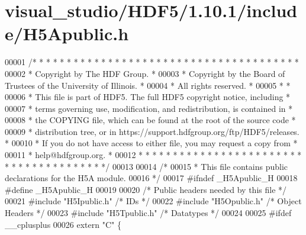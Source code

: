 \hypertarget{visual__studio_2_h_d_f5_21_810_81_2include_2_h5_apublic_8h_source}{}\section{visual\+\_\+studio/\+H\+D\+F5/1.10.1/include/\+H5\+Apublic.h}
\label{visual__studio_2_h_d_f5_21_810_81_2include_2_h5_apublic_8h_source}

\begin{DoxyCode}
00001 \textcolor{comment}{/* * * * * * * * * * * * * * * * * * * * * * * * * * * * * * * * * * * * * * *}
00002 \textcolor{comment}{ * Copyright by The HDF Group.                                               *}
00003 \textcolor{comment}{ * Copyright by the Board of Trustees of the University of Illinois.         *}
00004 \textcolor{comment}{ * All rights reserved.                                                      *}
00005 \textcolor{comment}{ *                                                                           *}
00006 \textcolor{comment}{ * This file is part of HDF5.  The full HDF5 copyright notice, including     *}
00007 \textcolor{comment}{ * terms governing use, modification, and redistribution, is contained in    *}
00008 \textcolor{comment}{ * the COPYING file, which can be found at the root of the source code       *}
00009 \textcolor{comment}{ * distribution tree, or in https://support.hdfgroup.org/ftp/HDF5/releases.  *}
00010 \textcolor{comment}{ * If you do not have access to either file, you may request a copy from     *}
00011 \textcolor{comment}{ * help@hdfgroup.org.                                                        *}
00012 \textcolor{comment}{ * * * * * * * * * * * * * * * * * * * * * * * * * * * * * * * * * * * * * * */}
00013 
00014 \textcolor{comment}{/*}
00015 \textcolor{comment}{ * This file contains public declarations for the H5A module.}
00016 \textcolor{comment}{ */}
00017 \textcolor{preprocessor}{#ifndef \_H5Apublic\_H}
00018 \textcolor{preprocessor}{#define \_H5Apublic\_H}
00019 
00020 \textcolor{comment}{/* Public headers needed by this file */}
00021 \textcolor{preprocessor}{#include "H5Ipublic.h"}      \textcolor{comment}{/* IDs                  */}
00022 \textcolor{preprocessor}{#include "H5Opublic.h"}      \textcolor{comment}{/* Object Headers           */}
00023 \textcolor{preprocessor}{#include "H5Tpublic.h"}      \textcolor{comment}{/* Datatypes                */}
00024 
00025 \textcolor{preprocessor}{#ifdef \_\_cplusplus}
00026 \textcolor{keyword}{extern} \textcolor{stringliteral}{"C"} \{

\end{DoxyCode}
